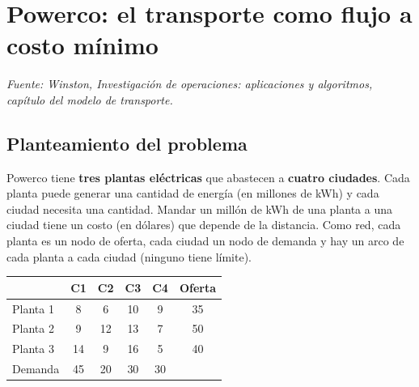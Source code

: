 \documentclass[11pt,a4paper]{article}
\begin{document}
\section{Powerco: el transporte como flujo a costo mínimo}
\textit{Fuente: Winston, Investigación de operaciones: aplicaciones y algoritmos, capítulo del modelo de transporte.}

\subsection*{Planteamiento del problema}
Powerco tiene \textbf{tres plantas eléctricas} que abastecen a \textbf{cuatro ciudades}. Cada planta puede generar
una cantidad de energía (en millones de kWh) y cada ciudad necesita una cantidad. Mandar un millón de kWh de una planta
a una ciudad tiene un costo (en dólares) que depende de la distancia. Como red, cada planta es un nodo de oferta, cada
ciudad un nodo de demanda y hay un arco de cada planta a cada ciudad (ninguno tiene límite).

\noindent
\begin{minipage}[c]{0.44\textwidth}\small\centering
\begin{tabular}{lccccc}
\toprule
 & \textbf{C1} & \textbf{C2} & \textbf{C3} & \textbf{C4} & \textbf{Oferta} \\
\midrule
Planta 1 & 8  & 6  & 10 & 9  & 35 \\
Planta 2 & 9  & 12 & 13 & 7  & 50 \\
Planta 3 & 14 & 9  & 16 & 5  & 40 \\
\midrule
Demanda  & 45 & 20 & 30 & 30 & \\
\bottomrule
\end{tabular}
\end{minipage}\hfill
\begin{minipage}[c]{0.54\textwidth}\centering
{}
\end{minipage}
\end{document}
